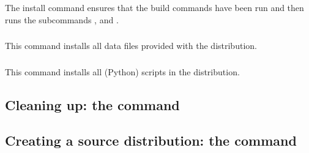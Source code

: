 \documentclass{howto}
\begin{document}
The install command ensures that the build commands have been run and then
runs the subcommands ,
 and
.

\subsubsection{\protect{}}
\label{install-lib-cmd}

\subsubsection{\protect{}}
\label{install-data-cmd}
This command installs all data files provided with the distribution.

\subsubsection{\protect{}}
\label{install-scripts-cmd}
This command installs all (Python) scripts in the distribution.


\subsection{Cleaning up: the \protect{} command}
\label{clean-cmd}


\subsection{Creating a source distribution: the \protect{} command}
\label{sdist-cmd}
\end{document}

